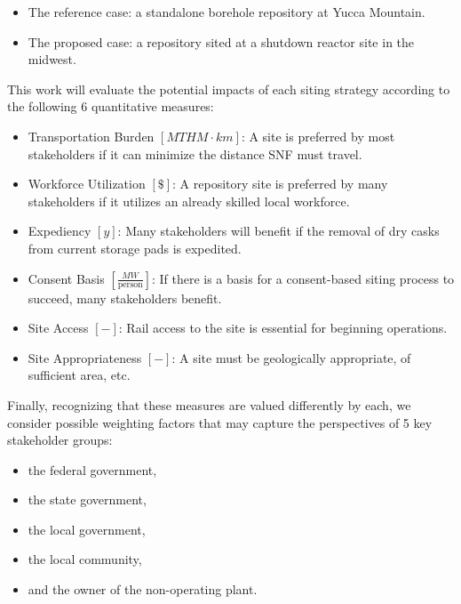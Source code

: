 \begin{itemize}
        \item The reference case: a standalone borehole repository at Yucca Mountain.  
        \item The proposed case: a repository sited at a shutdown reactor site 
                in the midwest.

\end{itemize}

 This work will evaluate the potential impacts of each siting strategy according 
to the following 6 quantitative measures:

\begin{itemize}
        \item Transportation Burden $[MTHM \cdot km]$: A site is preferred by 
                most stakeholders if it can minimize the distance \gls{SNF} 
                must travel.
        \item Workforce Utilization $[\$]$: A repository site is preferred by 
                many stakeholders if it utilizes an already skilled local 
                workforce. 
        \item Expediency $[y]$: Many stakeholders will benefit if the removal 
                of dry casks from current storage pads is expedited.
        \item Consent Basis $[\frac{MW}{\mbox{person}}]$: If there is a basis for a consent-based 
                siting process to succeed, many stakeholders benefit.
        \item Site Access $[-]$: Rail access to the site is essential for 
                beginning operations.
        \item Site Appropriateness $[-]$: A site must be geologically 
                appropriate, of sufficient area, etc.
\end{itemize}

Finally, recognizing that these measures are valued differently by each, we
consider possible weighting factors that may capture the perspectives of 5 key
stakeholder groups:

\begin{itemize}
        \item the federal government,
        \item the state government,
        \item the local government,
        \item the local community,
        \item and the owner of the non-operating plant.
\end{itemize}


